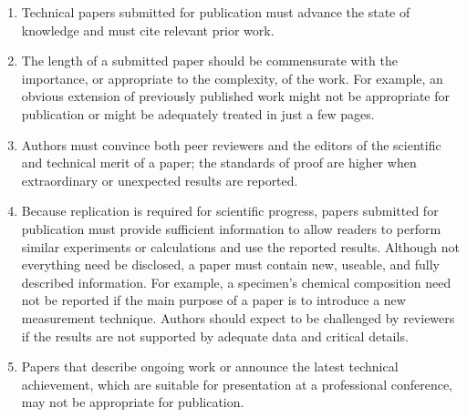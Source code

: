\documentclass[journal]{IEEEtranTIE}
\begin{document}
\begin{enumerate}[1)]
\item Technical papers submitted for publication must advance the state of knowledge and must cite relevant prior work.
\item The length of a submitted paper should be commensurate with the importance, or appropriate to the complexity, of the work. For example, an obvious extension of previously published work might not be appropriate for publication or might be adequately treated in just a few pages.
\item Authors must convince both peer reviewers and the editors of the scientific and technical merit of a paper; the standards of proof are higher when extraordinary or unexpected results are reported.
\item Because replication is required for scientific progress, papers submitted for publication must provide sufficient information to allow readers to perform similar experiments or calculations and use the reported results. Although not everything need be disclosed, a paper must contain new, useable, and fully described information. For example, a specimen's chemical composition need not be reported if the main purpose of a paper is to introduce a new measurement technique. Authors should expect to be challenged by reviewers if the results are not supported by adequate data and critical details.
\item Papers that describe ongoing work or announce the latest technical achievement, which are suitable for presentation at a professional conference, may not be appropriate for publication.
\end{enumerate}





\ %
\end{document}
